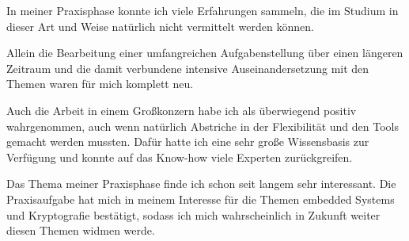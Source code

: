 In meiner Praxisphase konnte ich viele Erfahrungen sammeln, die im Studium in dieser Art und Weise natürlich nicht vermittelt werden können. 

Allein die Bearbeitung einer umfangreichen Aufgabenstellung über einen längeren Zeitraum und die damit verbundene intensive Auseinandersetzung mit den Themen waren für mich komplett neu. 

Auch die Arbeit in einem Großkonzern habe ich als überwiegend positiv wahrgenommen, auch wenn natürlich Abstriche in der Flexibilität und den Tools gemacht werden mussten. Dafür hatte ich eine sehr große Wissensbasis zur Verfügung und konnte auf das Know-how viele Experten zurückgreifen. 

Das Thema meiner Praxisphase finde ich schon seit langem sehr interessant. Die Praxisaufgabe hat mich in meinem Interesse für die Themen embedded Systems und Kryptografie bestätigt, sodass ich mich wahrscheinlich in Zukunft weiter diesen Themen widmen werde. 




